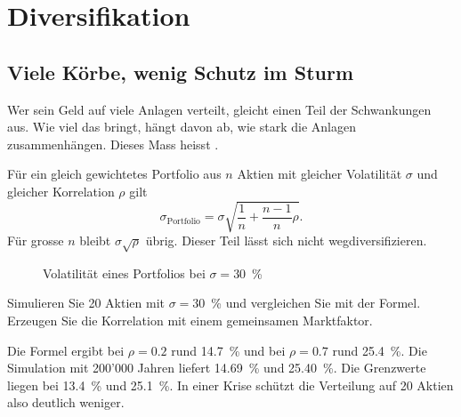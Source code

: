 \chapter{Diversifikation}



\section{Viele Körbe, wenig Schutz im Sturm}
Wer sein Geld auf viele Anlagen verteilt, gleicht einen Teil der Schwankungen aus. Wie viel das bringt, hängt davon ab, wie stark die Anlagen zusammenhängen. Dieses Mass heisst .

Für ein gleich gewichtetes Portfolio aus $n$ Aktien mit gleicher Volatilität $\sigma$ und gleicher Korrelation $\rho$ gilt
\[
	\sigma_{\text{Portfolio}} = \sigma\sqrt{\frac{1}{n} + \frac{n-1}{n}\rho}.
\]
Für grosse $n$ bleibt $\sigma\sqrt{\rho}$ übrig. Dieser Teil lässt sich nicht wegdiversifizieren.

\begin{figure}[H]
	\centering
	\caption{Volatilität eines Portfolios bei $\sigma = 30$~\%}
\end{figure}

\begin{myexercise}
	Simulieren Sie 20 Aktien mit $\sigma = 30$~\% und vergleichen Sie mit der Formel. Erzeugen Sie die Korrelation mit einem gemeinsamen Marktfaktor.
	\begin{myanswer}
		Die Formel ergibt bei $\rho = 0.2$ rund 14.7~\% und bei $\rho = 0.7$ rund 25.4~\%. Die Simulation mit 200'000 Jahren liefert 14.69~\% und 25.40~\%. Die Grenzwerte liegen bei 13.4~\% und 25.1~\%. In einer Krise schützt die Verteilung auf 20 Aktien also deutlich weniger.
	\end{myanswer}
\end{myexercise}

